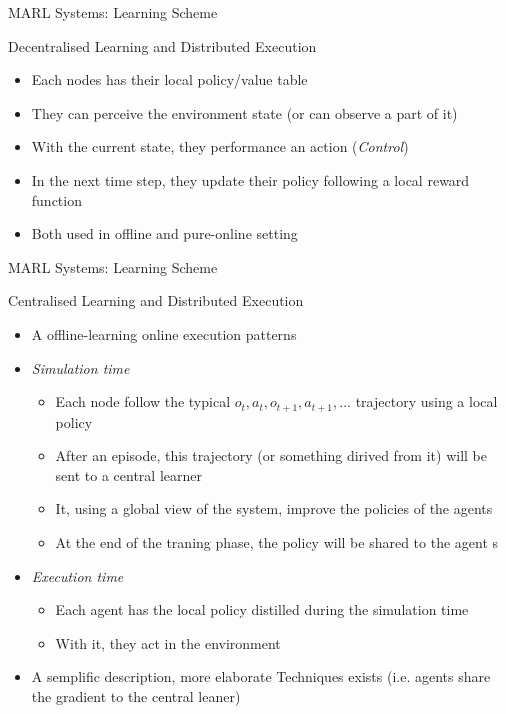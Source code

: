 \documentclass[presentation]{beamer}\mode<presentation>{\usetheme{AMSBolognaFC}}
\begin{document}
\begin{frame}{MARL Systems: Learning Scheme}
	
	\begin{exampleblock}{Decentralised Learning and Distributed Execution}
		\begin{itemize}
			\item Each nodes has their local policy/value table
			\item They can perceive the environment state (or can observe a part of it)
			\item With the current state, they performance an action (\emph{Control})
			\item In the next time step, they update their policy following a local reward function 
			\item Both used in offline and pure-online setting
		\end{itemize}
	\end{exampleblock}
\end{frame}
\begin{frame}{MARL Systems: Learning Scheme}
	
	\begin{exampleblock}{Centralised Learning and Distributed Execution}
		\begin{itemize}
			\item A offline-learning online execution patterns
			\item \emph{Simulation time}
			\begin{itemize}
				\item Each node follow the typical $o_t, a_t, o_{t+1}, a_{t+1},\dots $ trajectory using a local policy
				\item After an episode, this trajectory (or something dirived from it) will be sent to a central learner
				\item It, using a global view of the system, improve the policies of the agents 
				\item At the end of the traning phase, the policy will be shared to the agent s
			\end{itemize} 
			\item \emph{Execution time}
				\begin{itemize}
					\item Each agent has the local policy distilled during the simulation time
					\item With it, they act in the environment
				\end{itemize}
			\item A semplific description, more elaborate Techniques exists (i.e. agents share the gradient to the central leaner)
		\end{itemize}
	\end{exampleblock}
\end{frame}
\end{document}

